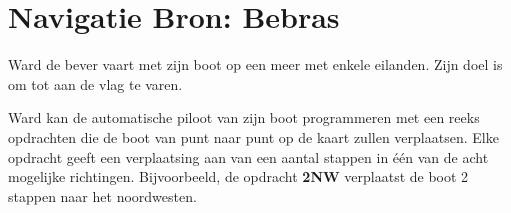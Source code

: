 \documentclass[12pt, a4paper]{article}
\begin{document}
	\begin{minipage}{\textwidth}
		\section{Navigatie \hfill\small Bron: Bebras}
			
			Ward de bever vaart met zijn boot op een meer met enkele eilanden. Zijn doel is om tot aan de vlag te varen.
			
			Ward kan de automatische piloot van zijn boot programmeren met een reeks opdrachten die de boot van punt naar punt op de kaart zullen verplaatsen. Elke opdracht geeft een verplaatsing aan van een aantal stappen in \'e\'en van de acht mogelijke richtingen. Bijvoorbeeld, de opdracht \textbf{2NW} verplaatst de boot 2 stappen naar het noordwesten.
			

\end{minipage}
\end{document}
